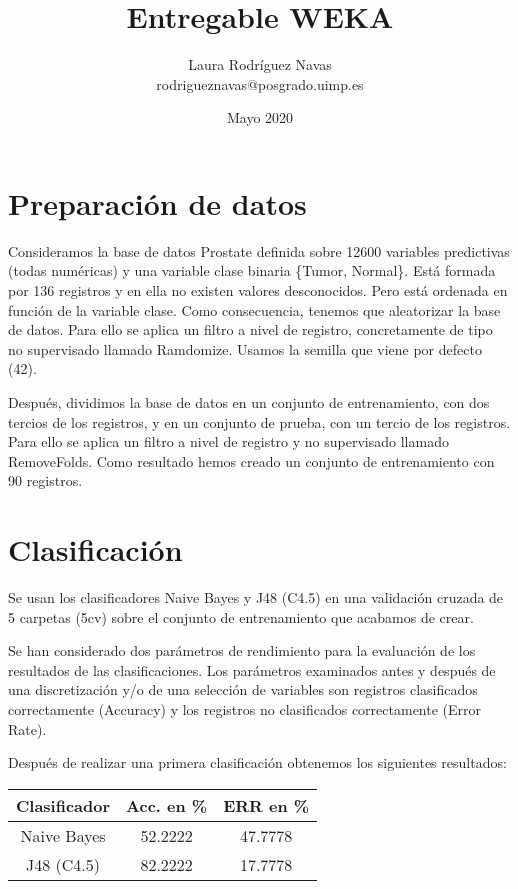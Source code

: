 \documentclass{article}
\title{Entregable WEKA}
\author{Laura Rodríguez Navas \\ rodrigueznavas@posgrado.uimp.es}
\date{Mayo 2020}
\begin{document}
\maketitle

\section*{Preparación de datos}

Consideramos la base de datos Prostate definida sobre 12600 variables predictivas (todas numéricas) y una variable clase binaria \{Tumor, Normal\}. Está formada por 136 registros y en ella no existen valores desconocidos. Pero está ordenada en función de la variable clase. Como consecuencia, tenemos que aleatorizar la base de datos. Para ello se aplica un filtro a nivel de registro, concretamente de tipo no supervisado llamado Ramdomize. Usamos la semilla que viene por defecto (42).

Después, dividimos la base de datos en un conjunto de entrenamiento, con dos tercios de los registros, y en un conjunto de prueba, con un tercio de los registros. Para ello se aplica un filtro a nivel de registro y no supervisado llamado RemoveFolds. Como resultado hemos creado un conjunto de entrenamiento con 90 registros.

\section*{Clasificación}

Se usan los clasificadores Naive Bayes y J48 (C4.5) en una validación cruzada de 5 carpetas (5cv) sobre el conjunto de entrenamiento que acabamos de crear.

Se han considerado dos parámetros de rendimiento para la evaluación de los resultados de las clasificaciones. Los parámetros examinados antes y después de una discretización y/o de una selección de variables son registros clasificados correctamente (Accuracy) y los registros no clasificados correctamente (Error Rate). 

Después de realizar una primera clasificación obtenemos los siguientes resultados:

\begin{center}
	\begin{tabular}{ |c|c|c| } 
		\hline
		Clasificador & Acc. en \% & ERR en \% \\
		\hline
		Naive Bayes & 52.2222 & 47.7778 \\ 
		J48 (C4.5) & 82.2222 & 17.7778 \\ 
		\hline
	\end{tabular}
\end{center}
\end{document}
